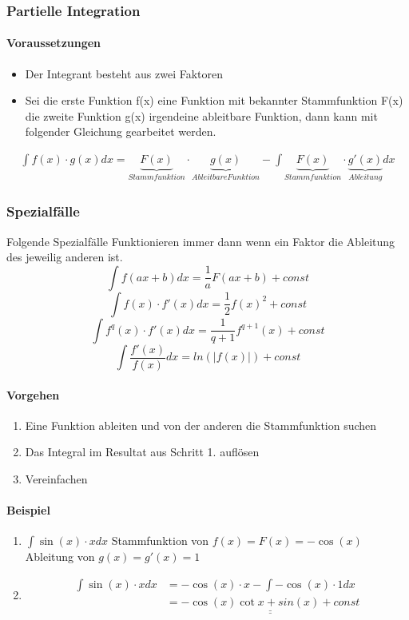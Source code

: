\subsubsection{Partielle Integration}
\paragraph{Voraussetzungen}
\begin{itemize}
	\item Der Integrant besteht aus zwei Faktoren
	\item Sei die erste Funktion f(x) eine Funktion mit bekannter Stammfunktion F(x) die zweite Funktion g(x) irgendeine ableitbare Funktion, dann kann mit folgender Gleichung gearbeitet werden.
\end{itemize}
\begin{align}
	\int f(x)\cdot g(x) dx = \underbrace{F(x)}_{Stammfunktion} \cdot \underbrace{g(x)}_{Ableitbare Funktion} - \int \underbrace{F(x)}_{Stammfunktion}\cdot \underbrace{g'(x)}_{Ableitung}dx
\end{align}

\subsubsection{Spezialfälle}
Folgende Spezialfälle Funktionieren immer dann wenn ein Faktor die Ableitung des jeweilig anderen ist.
\[
\int f(ax + b) dx = \frac{1}{a} F(ax + b) + const
\]
\[
\int f(x) \cdot f'(x) dx = \frac{1}{2} f(x)^2 + const
\]
\[
\int f^q(x) \cdot f'(x) dx = \frac{1}{q+1} f^{q+1} (x) + const
\]
\[
\int \frac{f'(x)}{f(x)} dx = ln(|f(x)|) + const
\]


\paragraph{Vorgehen}
\begin{enumerate}
	\item Eine Funktion ableiten und von der anderen die Stammfunktion suchen
	\item Das Integral im Resultat aus Schritt 1. auflösen
	\item Vereinfachen
\end{enumerate}

\paragraph{Beispiel}
\begin{enumerate}
	\item $\int \sin(x) \cdot x dx$
	\subitem Stammfunktion von $f(x) = F(x) = -\cos(x)$
	\subitem Ableitung von $g(x) = g'(x) = 1$
	\item 
	\begin{align*}
	\int \sin(x) \cdot x dx &= -\cos(x) \cdot x - \int -\cos(x) \cdot 1 dx \\
	&= \underline{\underline{-\cos(x) \cot x + sin(x) + const}}
	\end{align*}

\end{enumerate}

